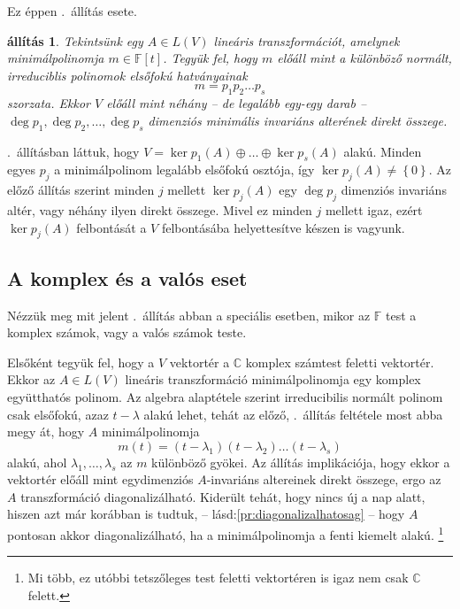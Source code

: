 \documentclass[9pt, a4paper, showtrims]{memoir}
\makeatletter
\let\Aref\relax
\renewenvironment{proof}[1][\proofname]
    {\par\pushQED{\qed}%
    \normalfont \topsep6\p@\@plus6\p@\relax
    \trivlist
    \item[\hskip\labelsep
        \itshape
    #1\@addpunct{:}]\ignorespaces}
    {\popQED\endtrivlist\@endpefalse}
\theoremstyle{plain}
\newtheorem{proposition}{állítás}[chapter]
\theoremstyle{remark}
\theoremstyle{definition}
\makeatother
\begin{document}
Ez éppen .~állítás esete.
\begin{proposition}\label{pr:minpolelsofokufelbontas}
	Tekintsünk egy $A\in L\left( V \right)$ lineáris transzformációt,
	amelynek minimálpolinomja $m\in\mathbb{F}\left[ t \right]$.
	Tegyük fel,
	hogy $m$ előáll mint a különböző normált, irreduciblis polinomok elsőfokú hatványainak
	\[
		m=p_1p_2\dots p_s
	\]
	szorzata.
	Ekkor $V$ előáll mint néhány -- de legalább egy-egy darab --
	$\deg p_1,\deg p_2,\ldots,\deg p_s$ dimenziós minimális invariáns alterének direkt összege.
\end{proposition}
\begin{proof}
	\Aref{pr:redukcio-primfelbontas}.~állításban láttuk,
	hogy $V=\ker p_1\left( A \right)\oplus\dots\oplus\ker p_s\left( A \right)$ alakú.
	Minden egyes $p_j$ a minimálpolinom legalább elsőfokú osztója, így $\ker p_j\left( A \right)\neq\left\{ 0 \right\}$.
	Az előző állítás szerint minden $j$ mellett $\ker p_j\left( A \right)$ egy $\deg p_j$
	dimenziós invariáns altér, vagy néhány ilyen direkt összege.
	Mivel ez minden $j$ mellett igaz, ezért $\ker p_j\left( A \right)$ felbontását a $V$ felbontásába helyettesítve készen is vagyunk.
\end{proof}
\subsection{A komplex és a valós eset}
Nézzük meg mit jelent .~állítás abban a speciális esetben,
mikor az $\mathbb{F}$ test a komplex számok, vagy a valós számok teste.

Elsőként tegyük fel, hogy a $V$ vektortér a $\mathbb{C}$ komplex számtest feletti vektortér.
Ekkor az $A\in L\left( V \right)$ lineáris transzformáció minimálpolinomja egy komplex együtthatós polinom.
Az algebra alaptétele szerint irreducibilis normált polinom csak elsőfokú, azaz $t-\lambda$ alakú lehet,
tehát az előző, .~állítás feltétele most abba megy át, hogy $A$ minimálpolinomja
\[
	m\left( t \right)=\left( t-\lambda_1 \right)\left( t-\lambda_2 \right)\dots\left( t-\lambda_s \right)
\]
alakú, ahol $\lambda_1,\ldots,\lambda_s$ az $m$ különböző gyökei.
Az állítás implikációja, hogy ekkor a vektortér előáll mint egydimenziós $A$-invariáns
altereinek direkt összege, ergo az $A$ transzformáció diagonalizálható.
Kiderült tehát, hogy nincs új a nap alatt, hiszen azt már korábban is tudtuk, -- lásd:\ref{pr:diagonalizalhatosag} -- hogy $A$ pontosan akkor diagonalizálható, ha a minimálpolinomja a fenti kiemelt alakú.%
\footnote{
    Mi több, ez utóbbi tetszőleges test feletti vektortéren is igaz nem csak $\mathbb{C}$ felett.
}
\end{document}
